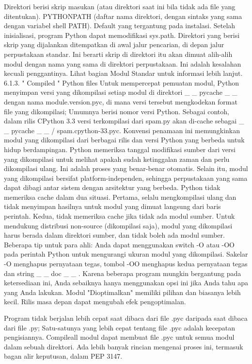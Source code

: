   \bullet  Direktori berisi skrip masukan (atau direktori saat ini bila tidak ada file yang ditentukan).  
  \bullet  PYTHONPATH (daftar nama direktori, dengan sintaks yang sama dengan variabel shell PATH).  
  \bullet  Default yang tergantung pada instalasi. 
Setelah inisialisasi, program Python dapat memodifikasi sys.path. Direktori yang berisi skrip yang dijalankan ditempatkan di awal jalur pencarian, di depan jalur perpustakaan standar. Ini berarti skrip di direktori itu akan dimuat alih-alih modul dengan nama yang sama di direktori perpustakaan. Ini adalah kesalahan kecuali penggantinya. Lihat bagian Modul Standar untuk informasi lebih lanjut.  
6.1.3.   " Compiled  "  Python files  
Untuk mempercepat pemuatan modul, Python menyimpan versi yang dikompilasi setiap modul di direktori    \_     \_  pycache   \_     \_   dengan nama module.version.pyc, di mana versi tersebut mengkodekan format file yang dikompilasi; Umumnya berisi nomor versi Python. Sebagai contoh, dalam rilis CPython 3.3 versi terkompilasi dari spam.py akan di-cache sebagai    \_     \_  pycache    \_     \_   / spam.cpython-33.pyc. Konvensi penamaan ini memungkinkan modul yang dikompilasi dari berbagai rilis dan versi Python yang berbeda untuk hidup berdampingan.  
Python memeriksa tanggal modifikasi sumber dari versi yang dikompilasi untuk melihat apakah sudah ketinggalan zaman dan perlu dikompilasi ulang. Ini adalah proses yang benar-benar otomatis. Selain itu, modul yang dikompilasi bersifat platform-independen, sehingga perpustakaan yang sama dapat dibagi antar sistem dengan arsitektur yang berbeda. Python tidak memeriksa cache dalam dua situasi. Pertama, selalu mengkompilasi ulang dan tidak menyimpan hasilnya untuk modul yang dimuat langsung dari baris perintah. Kedua, tidak memeriksa cache jika tidak ada modul sumber. Untuk mendukung distribusi non-source (dikompilasi saja), modul yang dikompilasi harus berada dalam direktori sumber, dan tidak boleh ada modul sumber. 
Beberapa tip untuk para ahli:  
  \bullet  Anda dapat menggunakan switch -O atau -OO pada perintah Python untuk mengurangi ukuran modul yang dikompilasi. Sakelar -O menghapus pernyataan tegas, tombol -OO menghapus kedua pernyataan tegas dan string    \_     \_  doc   \_     \_  . Karena beberapa program mungkin bergantung pada ketersediaan ini, Anda sebaiknya hanya menggunakan opsi ini jika Anda tahu apa yang Anda lakukan. Modul "Dioptimalkan" memiliki pilihan dan biasanya lebih kecil. Rilis masa depan dapat mengubah efek pengoptimalan. \par
  \bullet  Program tidak berjalan lebih cepat saat dibaca dari file .pyc daripada saat dibaca dari file .py; Satu-satunya yang lebih cepat tentang file .pyc adalah kecepatan pengisiannya.  
  \bullet  Compileall modul dapat membuat file .pyc untuk semua modul dalam sebuah direktori.  
  \bullet  Ada lebih banyak rincian mengenai proses ini, termasuk bagan alir keputusan, dalam PEP 3147. 


